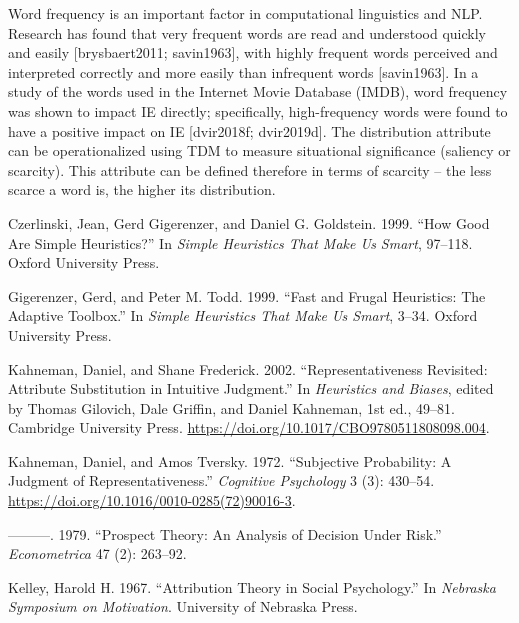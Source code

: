 \documentclass[
]{book}
\newlength{\cslhangindent}
\newlength{\cslentryspacingunit} %
\newenvironment{CSLReferences}[2] %
 {%
  \setlength{\parindent}{0pt}
  \ifodd #1
  \let\oldpar\par
  \def\par{\hangindent=\cslhangindent\oldpar}
  \fi
  \setlength{\parskip}{#2\cslentryspacingunit}
 }%
 {}
\begin{document}
Word frequency is an important factor in computational linguistics and NLP. Research has found that very frequent words are read and understood quickly and easily {[}brysbaert2011; savin1963{]}, with highly frequent words perceived and interpreted correctly and more easily than infrequent words {[}savin1963{]}. In a study of the words used in the Internet Movie Database (IMDB), word frequency was shown to impact IE directly; specifically, high-frequency words were found to have a positive impact on IE {[}dvir2018f; dvir2019d{]}. The distribution attribute can be operationalized using TDM to measure situational significance (saliency or scarcity). This attribute can be defined therefore in terms of scarcity -- the less scarce a word is, the higher its distribution.

\hypertarget{refs}{}
\begin{CSLReferences}{1}{0}
\leavevmode{}%
Czerlinski, Jean, Gerd Gigerenzer, and Daniel G. Goldstein. 1999. {``How Good Are Simple Heuristics?''} In \emph{Simple Heuristics That Make Us Smart}, 97--118. {Oxford University Press}.

\leavevmode{}%
Gigerenzer, Gerd, and Peter M. Todd. 1999. {``Fast and Frugal Heuristics: {The} Adaptive Toolbox.''} In \emph{Simple Heuristics That Make Us Smart}, 3--34. {Oxford University Press}.

\leavevmode{}%
Kahneman, Daniel, and Shane Frederick. 2002. {``Representativeness {Revisited}: {Attribute Substitution} in {Intuitive Judgment}.''} In \emph{Heuristics and {Biases}}, edited by Thomas Gilovich, Dale Griffin, and Daniel Kahneman, 1st ed., 49--81. {Cambridge University Press}. \url{https://doi.org/10.1017/CBO9780511808098.004}.

\leavevmode{}%
Kahneman, Daniel, and Amos Tversky. 1972. {``Subjective Probability: {A} Judgment of Representativeness.''} \emph{Cognitive Psychology} 3 (3): 430--54. \url{https://doi.org/10.1016/0010-0285(72)90016-3}.

\leavevmode{}%
---------. 1979. {``Prospect {Theory}: {An Analysis} of {Decision} Under {Risk}.''} \emph{Econometrica} 47 (2): 263--92.

\leavevmode{}%
Kelley, Harold H. 1967. {``Attribution Theory in Social Psychology.''} In \emph{Nebraska Symposium on Motivation}. {University of Nebraska Press}.


\end{CSLReferences}
\end{document}

